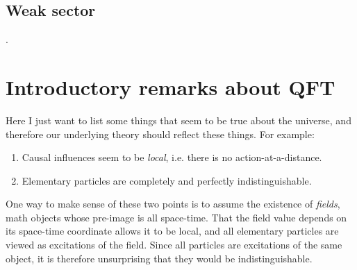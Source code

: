 \subsection{Weak sector}

%
%
\cite{aad_observation_2012,chatrchyan_observation_2012}.

\section{Introductory remarks about QFT} 

Here I just want to list some things that seem to be true about the universe,
and therefore our underlying theory should reflect these things. For example:
\begin{enumerate}
  \item Causal influences seem to be {\it local}, i.e. there is no
        action-at-a-distance.
  \item Elementary particles are completely and perfectly indistinguishable.
\end{enumerate}
One way to make sense of these two points is to assume the existence of 
{\it fields}, math objects whose pre-image is all space-time.
That the field value depends on its space-time coordinate allows it to be local,
and all elementary particles are viewed as excitations of the field. Since all
particles are excitations of the same object, it is therefore unsurprising that
they would be indistinguishable.


